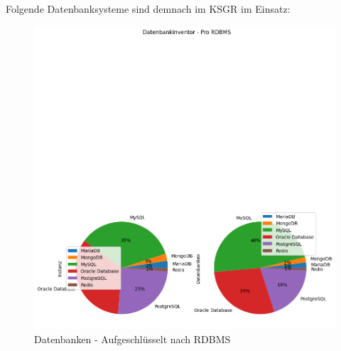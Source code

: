 \begin{flushleft}
    Folgende Datenbanksysteme sind demnach im KSGR im Einsatz:
    
\end{flushleft}
\begin{flushleft}
    \begin{figure}[H]
        \centering
        \includegraphics[width=1\linewidth]{source/pandas_data_chart_plotter/db_inventory_per_rdbms}
        \caption{Datenbanken - Aufgeschlüsselt nach RDBMS}
        \label{fig:db_inventory_per_rdbms}
    \end{figure}
\end{flushleft}
